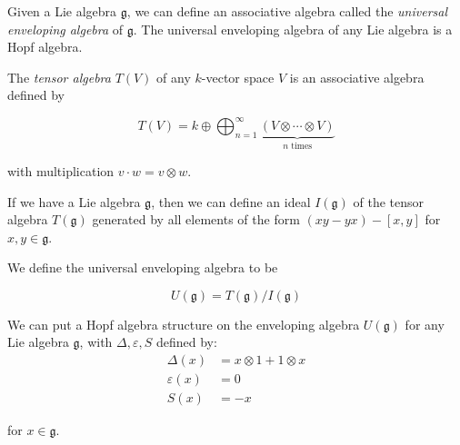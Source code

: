 \begin{example}
    \label{UnivEnvAlg}
    Given a Lie algebra $\mathfrak{g}$, we can define an associative algebra
    called the \emph{universal enveloping algebra} of $\mathfrak{g}$. The
    universal enveloping algebra of any Lie algebra is a Hopf algebra.

    The \emph{tensor algebra} $T(V)$ of any $k$-vector space $V$ is an associative
    algebra defined by

    \begin{equation}
        T(V) = k \oplus \bigoplus_{n=1}^\infty \underbrace{(V \otimes \cdots \otimes V)}_{\text{$n$ times}}
    \end{equation}

    with multiplication $v \cdot w = v \otimes w$.


    If we have a Lie algebra $\mathfrak{g}$, then we can define an ideal
    $I(\mathfrak{g})$ of the tensor algebra $T(\mathfrak{g})$ generated by all
    elements of the form $(xy - yx) - \left[ x,y \right]$ for $x,y \in
    \mathfrak{g}$.

    We define the universal enveloping algebra to be 

    \begin{equation}
        U(\mathfrak{g}) = T(\mathfrak{g}) / I(\mathfrak{g})
    \end{equation}

    We can put a Hopf algebra structure on the enveloping algebra
    $U(\mathfrak{g})$ for any Lie algebra $\mathfrak{g}$, with $\Delta,
    \varepsilon, S$ defined by: 
    \begin{align}
        \Delta(x) &= x \otimes 1 + 1 \otimes x \\
        \varepsilon(x) &= 0 \\
        S(x) &= -x  
    \end{align}

    for $x \in \mathfrak{g}$.

\end{example}



